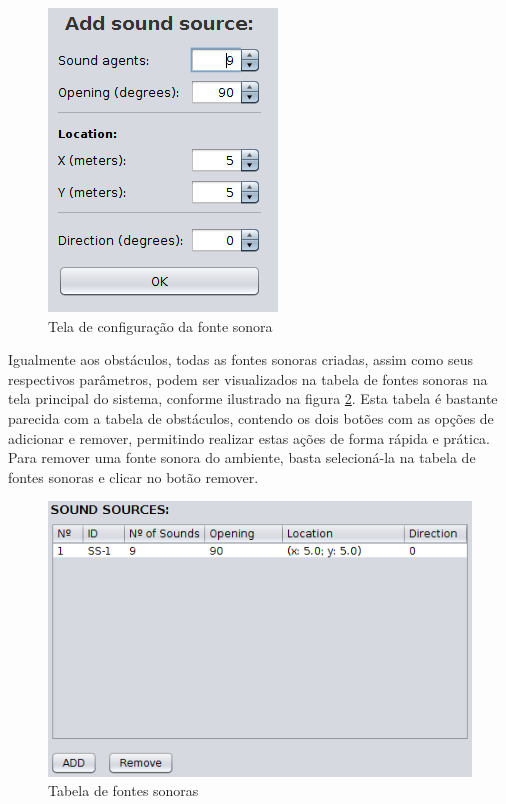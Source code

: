 \begin{figure}[!htb]
\centering
\includegraphics[scale=0.6]{figuras/telas/add_sound_source}
\caption{Tela de configuração da fonte sonora}
\label{sound_source_screen}
\end{figure}

Igualmente aos obstáculos, todas as fontes sonoras criadas, assim como seus respectivos parâmetros, podem ser visualizados na tabela de fontes sonoras na tela principal do sistema, conforme ilustrado na figura \ref{tabela_fs}. Esta tabela é bastante parecida com a tabela de obstáculos, contendo os dois botões com as opções de adicionar e remover, permitindo realizar estas ações de forma rápida e prática. Para remover uma fonte sonora do ambiente, basta selecioná-la na tabela de fontes sonoras e clicar no botão remover.

\begin{figure}[!htb]
\centering
\includegraphics[scale=0.6]{figuras/telas/ss_table}
\caption{Tabela de fontes sonoras}
\label{tabela_fs}
\end{figure}

